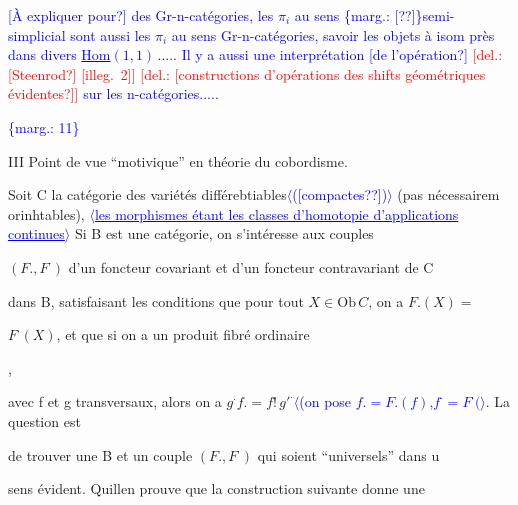 \documentclass[11pt]{article}
\newcommand{\scanpage}[1]{\par\bigskip\noindent{\small\sffamily[scan #1]}\par}
\newcommand{\mspage}[1]{{\small\sffamily[p.\,#1]}}
\newcommand{\hand}[1]{\textcolor{blue}{#1}}
\newcommand{\inserted}[2][]{\textcolor{blue}{$\langle$#2$\rangle$}}
\newcommand{\margin}[1]{\textcolor{blue}{\{\textsf{marg.:} #1\}}}
\newcommand{\deleted}[1]{\textcolor{red}{[\textsf{del.:} #1]}}
\newcommand{\uline}[1]{\underline{#1}}
\newcommand{\unsure}[1]{[#1?]}
\newcommand{\illegible}[1]{[\textsf{illeg.\ #1}]}
\newenvironment{diagramblock}{\par\begin{center}}{\end{center}\par}
\begin{document}
\hand{\unsure{À expliquer pour} des Gr-n-catégories, les $\pi_i$ au sens}
\margin{\unsure{?}}\hand{semi-simplicial sont aussi les $\pi_i$ au sens Gr-n-catégories,}
\hand{savoir les objets à isom près dans divers \uline{Hom}$(1,1)$\,..... Il y a}
\hand{aussi une interprétation \unsure{de l'opération} \deleted{\unsure{Steenrod} \illegible{2}}}
\hand{\deleted{\unsure{constructions d'opérations des shifts géométriques évidentes}} sur les}
\hand{n-catégories.....}

\margin{11}

\clearpage
\scanpage{162-5/12}
\mspage{11}

III Point de vue ``motivique'' en théorie du cobordisme.

Soit C la catégorie des variétés différebtiables\inserted{(\unsure{compactes?})} (pas nécessairem
orinhtables), \inserted[typed]{\uline{les morphismes étant les classes d'homotopie d'applications continues}} Si B est une catégorie, on s'intéresse aux couples

$(F.,F^{\cdot})$ d'un foncteur covariant et d'un foncteur contravariant de C

dans B, satisfaisant les conditions que pour tout $X\in \mathrm{Ob}\, C$, on a $F.(X)=$

$F^{\cdot}(X)$, et que si on a un produit fibré ordinaire
\begin{diagramblock}\end{diagramblock}
,

avec f et g transversaux, alors on a $g^{\cdot}f. = f!\, g'^{\cdot}$\inserted[typed]{(on pose $f.=F.(f)$,$f^{\cdot}=F^{\cdot}($}. La question est

de trouver une B et un couple $(F.,F^{\cdot})$ qui soient ``universels'' dans u

sens évident. Quillen prouve que la construction suivante donne une
\end{document}
